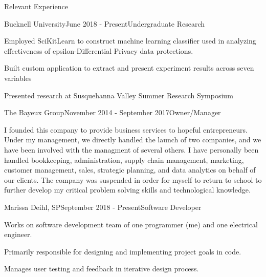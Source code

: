 \documentclass{resume} %
\begin{document}

\begin{rSection}{Relevant Experience}


\begin{rSubsection}{Bucknell University}{June 2018 - Present}{Undergraduate Research}{}
\item Employed SciKitLearn to construct machine learning classifier used in analyzing effectiveness of epsilon-Differential Privacy data protections.
\item Built custom application to extract and present experiment results across seven variables
\item Presented research at Susquehanna Valley Summer Research Symposium
\end{rSubsection}


\begin{rSubsection}{The Bayeux Group}{November 2014 - September 2017}{Owner/Manager}{}
\item I founded this company to provide business services to hopeful entrepreneurs. Under my management, we directly handled the launch of two companies, and we have been involved with the managment of several others. I have personally been handled bookkeeping, administration, supply chain management, marketing, customer management, sales, strategic planning, and data analytics on behalf of our clients. The company was suspended in order for myself to return to school to further develop my critical problem solving skills and technological knowledge.
\end{rSubsection}


\begin{rSubsection}{Marissa Deihl, SP}{September 2018 - Present}{Software Developer}{}
\item Works on software development team of one programmer (me) and one electrical engineer.
\item Primarily responsible for designing and implementing project goals in code.
\item Manages user testing and feedback in iterative design process.
\end{rSubsection}


\end{rSection}
\end{document}

